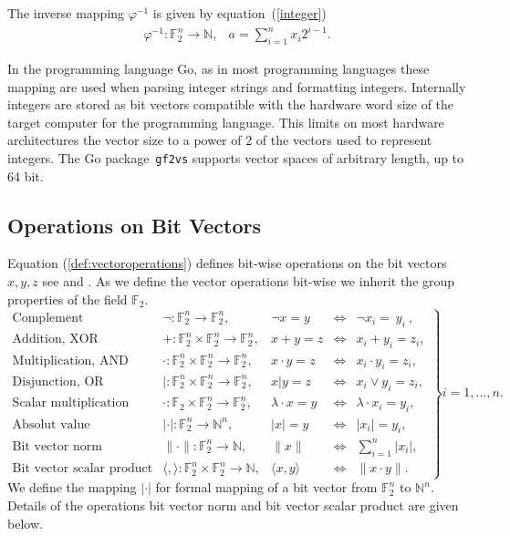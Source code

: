 \documentclass[a4paper]{article}
\newcommand{\BF}{\mathbb{F}}
\newcommand{\BN}{\mathbb{N}}
\newcommand{\0}{\mathbf{0}}
\newcommand{\1}{\mathbf{1}}
\begin{document}
The inverse mapping $\varphi^{-1}$ is given by equation~(\ref{integer})
\begin{equation}
\begin{array}{rr}
\varphi^{-1} : \BF_2^n \rightarrow \BN, &
a = \sum_{i=1}^n x_i 2 ^{i-1}.
\end{array}
\label{integer}
\end{equation}

In the programming language Go, as in most programming languages these mapping are
used when parsing integer strings and formatting integers.
Internally integers are stored as bit vectors compatible with the hardware word size of the target
computer for the programming language. This limits on most hardware architectures the vector size to a power of 2
of the vectors used to represent integers. 
The Go package~\texttt{gf2vs} supports vector spaces of arbitrary length, up to 64 bit.

\subsection{Operations on Bit Vectors}

Equation (\ref{def:vectoroperations}) defines bit-wise operations on the bit vectors $x, y, z$ see \cite[ch. 2.4.1]{Fischer2020} and \cite[(1), (2), (3)]{knuth:taocp_v4_f1}.
As we define the vector operations bit-wise we
inherit the group properties of the field $\BF_2$.
\begin{equation}
\left.
\begin{array}{lrrcrl}
\text{Complement} & \neg : \BF_2^n \to \BF_2^n, & \neg x = y & \Leftrightarrow & \neg x_i = \ y_i \ , \\
\text{Addition, XOR} &+ : \BF_2^n \times \BF_2^n \to \BF_2^n,  & x + y = z & \Leftrightarrow & x_i + y_i = z_i, \\
\text{Multiplication, AND} & \cdot : \BF_2^n \times \BF_2^n \to \BF_2^n,  & x \cdot y = z  & \Leftrightarrow & x_i \cdot y_i = z_i, \\
\text{Disjunction, OR} &| : \BF_2^n \times \BF_2^n \to \BF_2^n,  & x | y = z  & \Leftrightarrow & x_i \vee y_i = z_i,   \\
\text{Scalar multiplication} &\cdot : \BF_2 \times \BF_2^n \to \BF_2^n, & \lambda \cdot x = y  & \Leftrightarrow & \lambda \cdot x_i  = y_i,   \\
\text{Absolut value} & | \cdot |: \BF_2^n \to \BN^n, & |x| = y & \Leftrightarrow & | x_i | = y_i, \\
\text{Bit vector norm} & \| \cdot \| : \BF_2^n \to \BN, & \| x \| & \Leftrightarrow & \sum_{i=1}^n |x_i|, \\
\text{Bit vector scalar product} & \langle , \rangle : \BF_2^n \times \BF_2^n \to \BN, & \langle x , y \rangle & \Leftrightarrow & \| x \cdot y \|.
\end{array}
\right\} i = 1, \dots, n.
\label{def:vectoroperations}
\end{equation}
We define the mapping $| \cdot |$ for formal mapping of a bit vector from $\BF_2^n$ to $\BN^n$.
Details of the operations bit vector norm and bit vector scalar product are given below.
\end{document}
